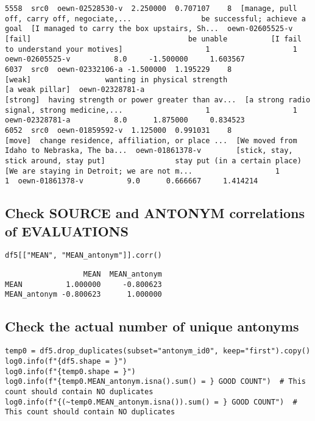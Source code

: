 \documentclass[a4paper,10pt,onecolumn,oneside,openright]{article}
\begin{document}
\begin{verbatim}
5558  src0  oewn-02528530-v  2.250000  0.707107    8  [manage, pull off, carry off, negociate,...                be successful; achieve a goal  [I managed to carry the box upstairs, Sh...  oewn-02605525-v                                       [fail]                                    be unable          [I fail to understand your motives]                   1                   1  oewn-02605525-v          8.0     -1.500000     1.603567
6037  src0  oewn-02332106-a -1.500000  1.195229    8                                       [weak]                 wanting in physical strength                              [a weak pillar]  oewn-02328781-a                                     [strong]  having strength or power greater than av...  [a strong radio signal, strong medicine,...                   1                   1  oewn-02328781-a          8.0      1.875000     0.834523
6052  src0  oewn-01859592-v  1.125000  0.991031    8                                       [move]  change residence, affiliation, or place ...  [We moved from Idaho to Nebraska, The ba...  oewn-01861378-v        [stick, stay, stick around, stay put]                stay put (in a certain place)  [We are staying in Detroit; we are not m...                   1                   1  oewn-01861378-v          9.0      0.666667     1.414214
\end{verbatim}
\subsection{Check SOURCE and ANTONYM correlations of EVALUATIONS}
\label{sec:org705975e}
\begin{verbatim}
df5[["MEAN", "MEAN_antonym"]].corr()
\end{verbatim}

\begin{verbatim}
                  MEAN  MEAN_antonym
MEAN          1.000000     -0.800623
MEAN_antonym -0.800623      1.000000
\end{verbatim}
\subsection{Check the actual number of unique antonyms}
\label{sec:org4c48b49}
\begin{verbatim}
temp0 = df5.drop_duplicates(subset="antonym_id0", keep="first").copy()
log0.info(f"{df5.shape = }")
log0.info(f"{temp0.shape = }")
log0.info(f"{temp0.MEAN_antonym.isna().sum() = } GOOD COUNT")  # This count should contain NO duplicates
log0.info(f"{(~temp0.MEAN_antonym.isna()).sum() = } GOOD COUNT")  # This count should contain NO duplicates

\end{verbatim}
\end{document}
